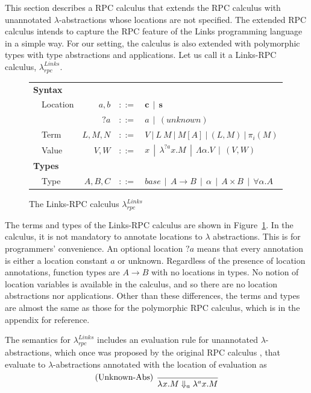 \documentclass[a4paper]{article}
\theoremstyle{plain}
\theoremstyle{definition}
\newcommand{\ruleverticalsep}{0.5cm}
\newcommand{\linksrpc}{$\lambda_{rpc}^{Links}$\xspace}
\newcommand{\client}{\textbf{c}}
\newcommand{\server}{\textbf{s}}
\newcommand{\evalRPC}[3]{#1\Downarrow_{#2}#3}
\newcommand{\lamL}[3]{\lambda^{#1}#2.#3}
\begin{document}
This section describes a RPC calculus that extends the RPC calculus
\cite{Cooper:2009:RC:1599410.1599439} with unannotated
$\lambda$-abstractions whose locations are not specified.
%
The extended RPC calculus intends to capture the RPC feature of the
Links programming language \cite{Cooper:2006:LWP:1777707.1777724} in a
simple way.
%
For our setting, the calculus is also extended with polymorphic types
with type abstractions and applications.
%
Let us call it a Links-RPC calculus, \linksrpc.


\begin{figure}[h]
\centering
\begin{tabular}{ l  l  r  c  l }
\multicolumn{5}{l}{\textbf{Syntax}} \\
 & Location & $a,b$   & $::=$ & $\client \ \ | \  \  \server$ \\
 &          & $?a$    & $::=$  & $a  \ \ |  \ \ (unknown) $ \\
 & Term     & $L,M,N$ & $::=$  & $V  \ | \  L \ M  \ | \  M[A]  \ | \  (L,M)  \ |  \ \pi_i(M)$ \\
 & Value & $V,W$ & $::=$ & $x  \ \ |  \ \ \lambda^{?a} x.M  \ \ |  \ \ \Lambda\alpha.V  \ \ |  \ \ (V,W)$
\\[\ruleverticalsep]
\multicolumn{5}{l}{\textbf{Types}} \\
& Type & $A,B,C$ & $::=$
& $base  \ \ | \ \  A \rightarrow B  \ \ | \ \  \alpha  \ \ | \ \  A \times B  \ \ | \ \  \forall\alpha.A$
\end{tabular}
\caption{The Links-RPC calculus \linksrpc}
\label{fig:linksrpc}
\end{figure}

The terms and types of the Links-RPC calculus are shown in
Figure~\ref{fig:linksrpc}.
%
In the calculus, it is not mandatory to annotate locations to
$\lambda$ abstractions. This is for programmers' convenience.
%
An optional location $?a$ means that every annotation is either a location constant $a$ or
unknown.
%
Regardless of the presence of location annotations, function types are
$A \rightarrow B$ with no locations in types.
%
No notion of location variables is available in the calculus, and so
there are no location abstractions nor applications.
%
Other than these differences, the terms and types are almost the same
as those for the polymorphic RPC calculus, which
is in the appendix for reference.
%


The semantics for \linksrpc includes an evaluation rule for
unannotated $\lambda$-abstractions, which once was proposed by the
original RPC calculus \cite{Cooper:2009:RC:1599410.1599439}, that
evaluate to $\lambda$-abstractions annotated with the location of
evaluation as
\[
\begin{prooftree}
  \infer[left label=(Unknown-Abs)]0{ \evalRPC{\lamL{}{x}{M}}{a}{\lamL{a}{x}{M} }}
\end{prooftree}
\]
%
\end{document}
